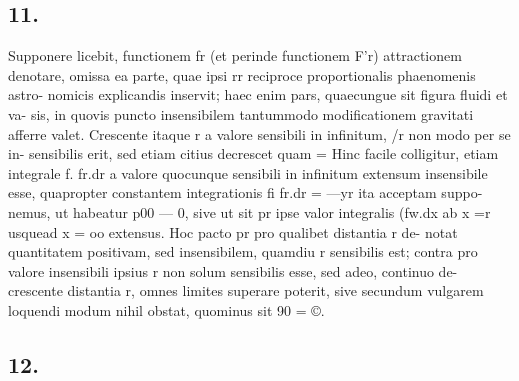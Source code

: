 \documentclass[12pt,a4paper]{article}
\begin{document}
\subsection*{11.}

Supponere licebit, functionem fr (et perinde functionem F'r) attractionem
denotare, omissa ea parte, quae ipsi rr reciproce proportionalis phaenomenis astro-
nomicis explicandis inservit; haec enim pars, quaecungue sit figura fluidi et va-
sis, in quovis puncto insensibilem tantummodo        modificationem gravitati afferre
valet.    Crescente itaque r a valore sensibili in infinitum, /r non modo per se in-
sensibilis erit, sed etiam citius decrescet quam =    Hinc facile colligitur, etiam
integrale f. fr.dr a valore quocunque sensibili in infinitum extensum insensibile
esse, quapropter constantem integrationis fi  fr.dr = ---yr ita acceptam suppo-
nemus, ut habeatur      p00 --- 0, sive ut sit pr ipse valor integralis (fw.dx ab
x =r usquead x = oo extensus.          Hoc pacto pr pro qualibet distantia r de-
notat quantitatem positivam, sed insensibilem, quamdiu r sensibilis est; contra
pro valore insensibili ipsius r non solum sensibilis esse, sed adeo, continuo de-
crescente distantia r, omnes limites superare poterit, sive secundum vulgarem
loquendi modum nihil obstat, quominus sit 90 = ©.


\subsection*{12.}
\end{document}
